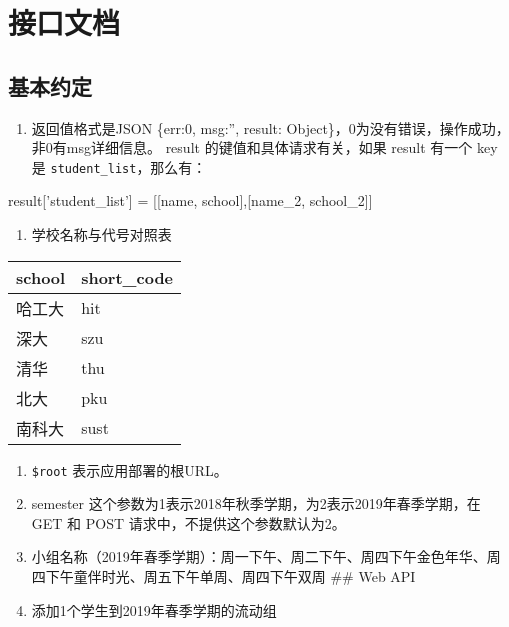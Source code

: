 \documentclass[]{article}
\date{}
\newenvironment{Shaded}{}{}
\newcommand{\NormalTok}[1]{#1}
\newcommand{\OperatorTok}[1]{\textcolor[rgb]{0.40,0.40,0.40}{#1}}
\newcommand{\StringTok}[1]{\textcolor[rgb]{0.25,0.44,0.63}{#1}}
\providecommand{\tightlist}{%
  \setlength{\itemsep}{0pt}\setlength{\parskip}{0pt}}
\begin{document}
\hypertarget{ux63a5ux53e3ux6587ux6863}{%
\section{接口文档}\label{ux63a5ux53e3ux6587ux6863}}

\hypertarget{ux57faux672cux7ea6ux5b9a}{%
\subsection{基本约定}\label{ux57faux672cux7ea6ux5b9a}}

\begin{enumerate}
\def\labelenumi{\arabic{enumi}.}
\tightlist
\item
  返回值格式是JSON \{err:0, msg:'', result:
  Object\}，0为没有错误，操作成功，非0有msg详细信息。 result
  的键值和具体请求有关，如果 result 有一个 key 是
  \texttt{student\_list}，那么有：
\end{enumerate}

\begin{Shaded}
\begin{Highlighting}[]
\NormalTok{result[}\StringTok{'student_list'}\NormalTok{] }\OperatorTok{=}\NormalTok{ [[name}\OperatorTok{,}\NormalTok{ school]}\OperatorTok{,}\NormalTok{[name_2}\OperatorTok{,}\NormalTok{ school_2]]}
\end{Highlighting}
\end{Shaded}

\begin{enumerate}
\def\labelenumi{\arabic{enumi}.}
\setcounter{enumi}{1}
\tightlist
\item
  学校名称与代号对照表
\end{enumerate}

\begin{longtable}[]{@{}ll@{}}
\toprule
school & short\_code\tabularnewline
\midrule
\endhead
哈工大 & hit\tabularnewline
深大 & szu\tabularnewline
清华 & thu\tabularnewline
北大 & pku\tabularnewline
南科大 & sust\tabularnewline
\bottomrule
\end{longtable}

\begin{enumerate}
\def\labelenumi{\arabic{enumi}.}
\setcounter{enumi}{2}
\item
  \texttt{\$root} 表示应用部署的根URL。
\item
  semester 这个参数为1表示2018年秋季学期，为2表示2019年春季学期，在 GET
  和 POST 请求中，不提供这个参数默认为2。
\item
  小组名称（2019年春季学期）：周一下午、周二下午、周四下午金色年华、周四下午童伴时光、周五下午单周、周四下午双周
  \#\# Web API
\item
  添加1个学生到2019年春季学期的流动组
\end{enumerate}
\end{document}
